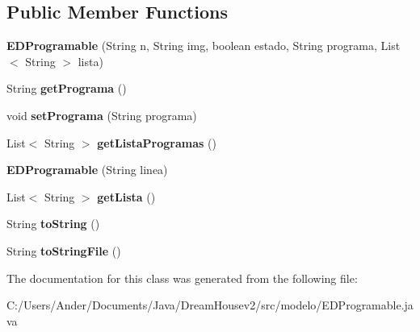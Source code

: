 \subsection*{Public Member Functions}
\begin{DoxyCompactItemize}
\item 
\mbox{\label{classmodelo_1_1_e_d_programable_acdbaee3588ae86f0b3846174a3315f7f}} 
{\bfseries E\+D\+Programable} (String n, String img, boolean estado, String programa, List$<$ String $>$ lista)
\item 
\mbox{\label{classmodelo_1_1_e_d_programable_a83fc76bd8e7b38da1eaca4adf090bc51}} 
String {\bfseries get\+Programa} ()
\item 
\mbox{\label{classmodelo_1_1_e_d_programable_a17f43d67346fc47216adb631225ca70b}} 
void {\bfseries set\+Programa} (String programa)
\item 
\mbox{\label{classmodelo_1_1_e_d_programable_a4831d2cbeb888123f271c6703d50a3d0}} 
List$<$ String $>$ {\bfseries get\+Lista\+Programas} ()
\item 
\mbox{\label{classmodelo_1_1_e_d_programable_ad7b55ad5c04fd084089e5d794ed65454}} 
{\bfseries E\+D\+Programable} (String linea)
\item 
\mbox{\label{classmodelo_1_1_e_d_programable_aa12df54712ea2dfc73fbb89da595ca11}} 
List$<$ String $>$ {\bfseries get\+Lista} ()
\item 
\mbox{\label{classmodelo_1_1_e_d_programable_afc84581d73aaf75bd833fe029a5d6f33}} 
String {\bfseries to\+String} ()
\item 
\mbox{\label{classmodelo_1_1_e_d_programable_a73931112f3e7effc39bed0223efaa428}} 
String {\bfseries to\+String\+File} ()
\end{DoxyCompactItemize}


The documentation for this class was generated from the following file\+:\begin{DoxyCompactItemize}
\item 
C\+:/\+Users/\+Ander/\+Documents/\+Java/\+Dream\+Housev2/src/modelo/E\+D\+Programable.\+java\end{DoxyCompactItemize}

